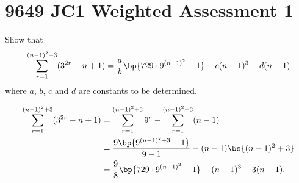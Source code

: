 \section{9649 JC1 Weighted Assessment 1}

\begin{problem}
    Show that \[\sum_{r=1}^{(n-1)^2 + 3} (3^{2r} - n + 1) = \frac{a}{b} \bp{729 \cdot 9^{(n-1)^2} - 1} - c(n-1)^3 - d(n-1)\] where $a$, $b$, $c$ and $d$ are constants to be determined.
\end{problem}
\begin{solution}
    \begin{align*}
        \sum_{r=1}^{(n-1)^2 + 3} (3^{2r} - n + 1) &= \sum_{r=1}^{(n-1)^2 + 3} 9^r  - \sum_{r=1}^{(n-1)^2 + 3}(n - 1)\\
        &= \frac{9\bp{9^{(n-1)^2 + 3} - 1}}{9-1} - (n-1)\bs{(n-1)^2 + 3}\\
        &= \frac98 \bp{729 \cdot 9^{(n-1)^2} - 1} - (n-1)^3 - 3(n-1).
    \end{align*}
\end{solution}

